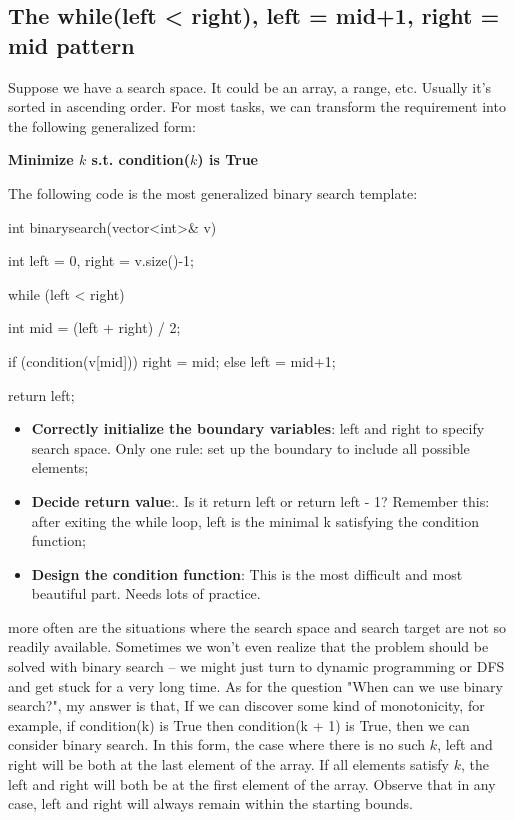 \documentclass{report}
\begin{document}
   \subsection{The while(left < right), left = mid+1, right = mid pattern}
   \bigbreak \noindent 
   Suppose we have a search space. It could be an array, a range, etc. Usually it's sorted in ascending order. For most tasks, we can transform the requirement into the following generalized form:
   \begin{center}
       \textbf{Minimize $k$ s.t. condition($k$) is True}
   \end{center}
   \bigbreak \noindent 
   The following code is the most generalized binary search template:
   \bigbreak \noindent 
   \begin{cppcode}
       int binarysearch(vector<int>& v) {
           int left = 0, right = v.size()-1;

           while (left < right) {
               int mid = (left + right) / 2;

               if (condition(v[mid])) {
                   right = mid;
               } else {
                   left =  mid+1;
               }
           }
           return left;
       }
   \end{cppcode}
   \begin{itemize}
       \item        \textbf{Correctly initialize the boundary variables}: left and right to specify search space. Only one rule: set up the boundary to include all possible elements;
       \item \textbf{Decide return value}:. Is it return left or return left - 1? Remember this: after exiting the while loop, left is the minimal k​ satisfying the condition function;
       \item \textbf{Design the condition function}: This is the most difficult and most beautiful part. Needs lots of practice.
   \end{itemize}
   \bigbreak \noindent 
   more often are the situations where the search space and search target are not so readily available. Sometimes we won't even realize that the problem should be solved with binary search -- we might just turn to dynamic programming or DFS and get stuck for a very long time.
   \bigbreak \noindent 
   As for the question "When can we use binary search?", my answer is that, If we can discover some kind of monotonicity, for example, if condition(k) is True then condition(k + 1) is True, then we can consider binary search.
   \bigbreak \noindent 
   In this form, the case where there is no such $k$, left and right will be both at the last element of the array. If all elements satisfy $k$, the left and right will both be at the first element of the array.
   \bigbreak \noindent 
   Observe that in any case, left and right will always remain within the starting bounds.
\end{document}
